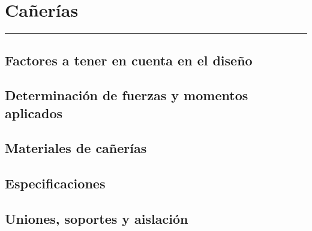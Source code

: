 \chapter{Cañerías}

\vspace{\fill}

\hrule

\vspace{.3cm}

{\large \lipsum[1]} 

\pagestyle{fancy}

\newpage


	\section{Factores a tener en cuenta en el diseño}
	\Biblio{}

	\section{Determinación de fuerzas y momentos aplicados}
	\Biblio{}

	\section{Materiales de cañerías}
	\Biblio{}

	\section{Especificaciones}
	\Biblio{}

	\section{Uniones, soportes y aislación}
	\Biblio{}








\newpage
\pagestyle{empty}